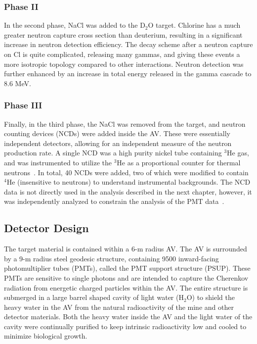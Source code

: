 \subsubsection{Phase II}

In the second phase, NaCl was added to the D$_2$O target.
Chlorine has a much greater neutron capture cross section than deuterium, resulting in a significant increase in neutron detection efficiency.
The decay scheme after a neutron capture on Cl is quite complicated, releasing many gammas, and giving these events a more isotropic topology compared to other interactions.
Neutron detection was further enhanced by an increase in total energy released in the gamma cascade to 8.6 MeV.

\subsubsection{Phase III}

Finally, in the third phase, the NaCl was removed from the target, and neutron counting devices (NCDs) were added inside the AV.
These were essentially independent detectors, allowing for an independent measure of the neutron production rate.
A single NCD was a high purity nickel tube containing $^3$He gas, and was instrumented to utilize the $^3$He as a proportional counter for thermal neutrons~\cite{sno_ncd_psa}.
In total, 40 NCDs were added, two of which were modified to contain $^4$He (insensitive to neutrons) to understand instrumental backgrounds.
The NCD data is not directly used in the analysis described in the next chapter, however, it was independently analyzed to constrain the analysis of the PMT data~\cite{sno}.

\subsection{Detector Design}

The target material is contained within a 6-m radius AV.
The AV is surrounded by a 9-m radius steel geodesic structure, containing 9500 inward-facing photomultiplier tubes (PMTs), called the PMT support structure (PSUP).
These PMTs are sensitive to single photons and are intended to capture the Cherenkov radiation from energetic charged particles within the AV.
The entire structure is submerged in a large barrel shaped cavity of light water (H$_2$O) to shield the heavy water in the AV from the natural radioactivity of the mine and other detector materials.
Both the heavy water inside the AV and the light water of the cavity were continually purified to keep intrinsic radioactivity low and cooled to minimize biological growth.

